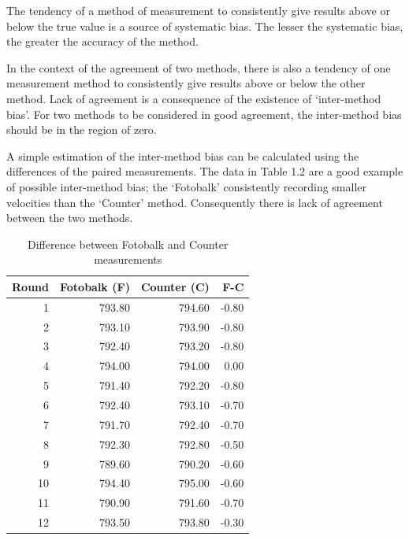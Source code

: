 \documentclass{report}
\begin{document}
The tendency of a method of measurement to consistently give
results above or below the true value is a source of systematic
bias. The lesser the systematic bias, the greater the accuracy of
the method.

In the context of the agreement of two methods, there is also a
tendency of one measurement method to consistently give results
above or below the other method. Lack of agreement is a
consequence of the existence of `inter-method bias'. For two
methods to be considered in good agreement, the inter-method bias
should be in the region of zero.

A simple estimation of the inter-method bias can be calculated
using the differences of the paired measurements. The data in
Table 1.2 are a good example of possible inter-method bias; the
`Fotobalk' consistently recording smaller velocities than the
`Counter' method. Consequently there is lack of agreement between
the two methods.
\newpage
\begin{table}[h!]
	\begin{center}
		
		\begin{tabular}{rrrr}
			\hline
			Round& Fotobalk (F) & Counter (C) & F-C \\
			\hline
			1 & 793.80 & 794.60 & -0.80 \\
			2 & 793.10 & 793.90 & -0.80 \\
			3 & 792.40 & 793.20 & -0.80 \\
			4 & 794.00 & 794.00 & 0.00 \\
			5 & 791.40 & 792.20 & -0.80 \\
			6 & 792.40 & 793.10 & -0.70 \\
			7 & 791.70 & 792.40 & -0.70 \\
			8 & 792.30 & 792.80 & -0.50 \\
			9 & 789.60 & 790.20 & -0.60 \\
			10 & 794.40 & 795.00 & -0.60 \\
			11 & 790.90 & 791.60 & -0.70 \\
			12 & 793.50 & 793.80 & -0.30 \\
			\hline
		\end{tabular}
		\caption{Difference between Fotobalk and Counter measurements}
	\end{center}
\end{table}

\bigskip
\end{document}
